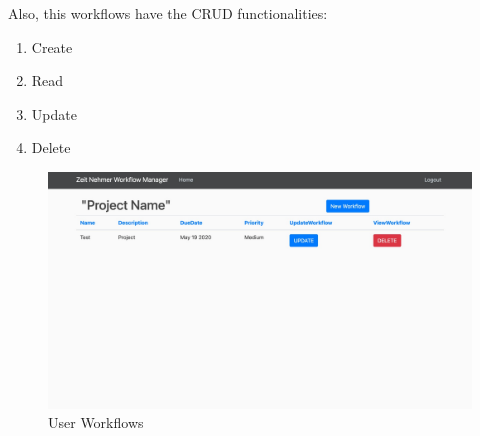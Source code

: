 \documentclass{article}[draft]
\begin{document}
Also, this workflows have the CRUD functionalities:
\begin{enumerate}
    \item Create
    \item Read
    \item Update
    \item Delete
\end{enumerate}
\begin{figure}[h!]
            \centering
            \includegraphics[width=1.2\columnwidth]{Images/Workflows.jpg}
            \caption{User Workflows}
            \label{fig:figure 9}
        \end{figure}
\end{document}
